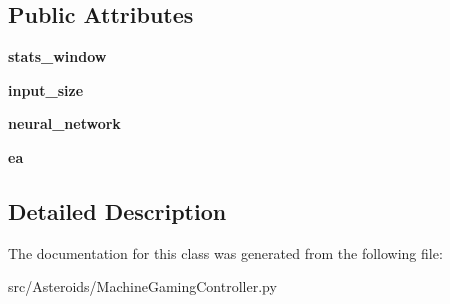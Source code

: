 \subsection*{Public Attributes}
\begin{DoxyCompactItemize}
\item 
{\bfseries stats\+\_\+window}\hypertarget{classMachineGamingController_1_1MachineGamingController_a5c7fa65b5ff61ced3e53b6a75be9b447}{}\label{classMachineGamingController_1_1MachineGamingController_a5c7fa65b5ff61ced3e53b6a75be9b447}

\item 
{\bfseries input\+\_\+size}\hypertarget{classMachineGamingController_1_1MachineGamingController_a5d895aaebf825121920b865c58f1e4a4}{}\label{classMachineGamingController_1_1MachineGamingController_a5d895aaebf825121920b865c58f1e4a4}

\item 
{\bfseries neural\+\_\+network}\hypertarget{classMachineGamingController_1_1MachineGamingController_a3976256fc7d27ebe7d28ec536911d62e}{}\label{classMachineGamingController_1_1MachineGamingController_a3976256fc7d27ebe7d28ec536911d62e}

\item 
{\bfseries ea}\hypertarget{classMachineGamingController_1_1MachineGamingController_afa9b244a5044affb82da318a3334d380}{}\label{classMachineGamingController_1_1MachineGamingController_afa9b244a5044affb82da318a3334d380}

\end{DoxyCompactItemize}


\subsection{Detailed Description}
\begin{DoxyVerb}\end{DoxyVerb}
 

The documentation for this class was generated from the following file\+:\begin{DoxyCompactItemize}
\item 
src/\+Asteroids/Machine\+Gaming\+Controller.\+py\end{DoxyCompactItemize}
